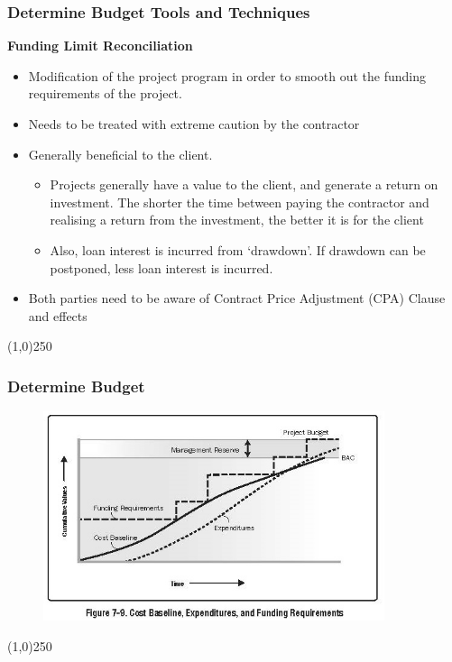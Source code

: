 \begin{frame}
\frametitle{Determine Budget \hfill\hfill Tools and Techniques }

\textbf{Funding Limit Reconciliation}\\
\begin{itemize}
	\item Modification of the project program in order to smooth out the funding requirements of the project.
	\item Needs to be treated with extreme caution by the contractor
	\item Generally beneficial to the client.
		\begin{itemize}
			\item Projects generally have a value to the client, and generate a return on investment.  The shorter the time between paying the contractor and realising a return from the investment, the better it is for the client
			\item Also, loan interest is incurred from ‘drawdown’.  If drawdown can be postponed, less loan interest is incurred.
		\end{itemize}
	\item Both parties need to be aware of Contract Price Adjustment (CPA) Clause and effects
\end{itemize}
\end{frame}
\begin{center}\line(1,0){250}\end{center}






\begin{frame}
\frametitle{Determine Budget}
\begin{figure}
	\centering
		\includegraphics[width = 10cm]{images/Fig7-9.jpg}
	\label{fig:Fig7-9}
\end{figure}

\end{frame}
\begin{center}\line(1,0){250}\end{center}






